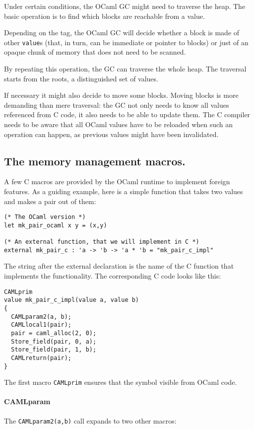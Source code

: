 \documentclass[a4paper]{easychair}
\newcommand{\cpp}[1]{\lstinline[style=C++]{#1}}
\begin{document}
Under certain conditions, the OCaml GC might need to traverse the heap.
The basic operation is to find which blocks are reachable from a value.

Depending on the tag, the OCaml GC will decide whether a block is made
of other \cpp{value}s (that, in turn, can be immediate or pointer to
blocks) or just of an opaque chunk of memory that does not need to be
scanned.

By repeating this operation, the GC can traverse the whole heap. The traversal
starts from the roots, a distinguished set of values.

If necessary it might also decide to move some blocks.  Moving blocks is more
demanding than mere traversal: the GC not only needs to know all values
referenced from C code, it also needs to be able to update them. The C compiler
needs to be aware that all OCaml values have to be reloaded when such an
operation can happen, as previous values might have been invalidated.

\subsection{The memory management macros.}

A few C macros are provided by the OCaml runtime to implement foreign
features. As a guiding example, here is a simple function that takes two
values and makes a pair out of them:
%
\begin{lstlisting}[]
(* The OCaml version *)
let mk_pair_ocaml x y = (x,y)

(* An external function, that we will implement in C *)
external mk_pair_c : 'a -> 'b -> 'a * 'b = "mk_pair_c_impl"
\end{lstlisting}

The string after the external declaration is the name of the C function that
implements the functionality.  The corresponding C code looks like this:
%
\begin{lstlisting}[style=C++]
CAMLprim
value mk_pair_c_impl(value a, value b)
{
  CAMLparam2(a, b);
  CAMLlocal1(pair);
  pair = caml_alloc(2, 0);
  Store_field(pair, 0, a);
  Store_field(pair, 1, b);
  CAMLreturn(pair);
}
\end{lstlisting}

The first macro \cpp{CAMLprim} ensures that the symbol visible from OCaml
code.

\paragraph{CAMLparam}
The \cpp{CAMLparam2(a,b)} call expands to two other macros:
\end{document}
